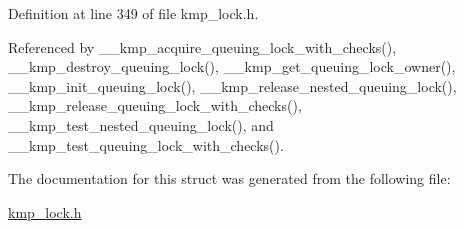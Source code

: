 Definition at line 349 of file kmp\-\_\-lock.\-h.



Referenced by \-\_\-\-\_\-kmp\-\_\-acquire\-\_\-queuing\-\_\-lock\-\_\-with\-\_\-checks(), \-\_\-\-\_\-kmp\-\_\-destroy\-\_\-queuing\-\_\-lock(), \-\_\-\-\_\-kmp\-\_\-get\-\_\-queuing\-\_\-lock\-\_\-owner(), \-\_\-\-\_\-kmp\-\_\-init\-\_\-queuing\-\_\-lock(), \-\_\-\-\_\-kmp\-\_\-release\-\_\-nested\-\_\-queuing\-\_\-lock(), \-\_\-\-\_\-kmp\-\_\-release\-\_\-queuing\-\_\-lock\-\_\-with\-\_\-checks(), \-\_\-\-\_\-kmp\-\_\-test\-\_\-nested\-\_\-queuing\-\_\-lock(), and \-\_\-\-\_\-kmp\-\_\-test\-\_\-queuing\-\_\-lock\-\_\-with\-\_\-checks().



The documentation for this struct was generated from the following file\-:\begin{DoxyCompactItemize}
\item 
\hyperlink{kmp__lock_8h}{kmp\-\_\-lock.\-h}\end{DoxyCompactItemize}
